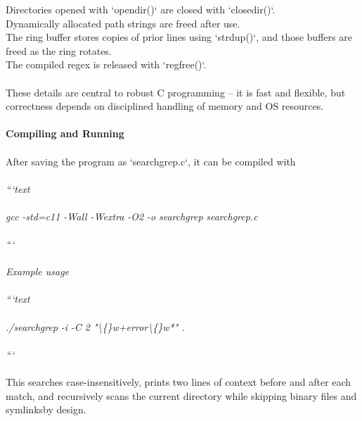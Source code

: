 \documentclass{article}
\begin{document}
{\normalsize Directories opened with }{\normalsize `}{\normalsize opendir}{\normalsize (}{\normalsize )` are closed with `}{\normalsize closedir}{\normalsize ()`.}\\
{\normalsize Dynamically allocated path strings are freed after use.}\\
{\normalsize The ring buffer stores copies of prior lines using `}{\normalsize strdup}{\normalsize (}{\normalsize )`, and those buffers are freed as the ring rotates.}\\
{\normalsize The compiled regex is released with `}{\normalsize regfre}{\normalsize e}{\normalsize (}{\normalsize )`.}\\
\\
{\normalsize These details are central to robust C programming – it is fast and flexible, but correctness depends on disciplined handling of memory and OS resources.}\\
\\
{\large \textbf{Compiling and Running}}\\
\\
{\normalsize After saving the program as `}{\normalsize searchgrep.c}{\normalsize `, it can be compiled with}\\
\\
{\normalsize \textit{```}}{\normalsize \textit{text}}\\
\\
{\normalsize \textit{gcc}}{\normalsize \textit{ -std=c11 -Wall -}}{\normalsize \textit{Wextra}}{\normalsize \textit{ -O2 -o }}{\normalsize \textit{searchgrep}}{\normalsize \textit{ }}{\normalsize \textit{searchgrep.c}}\\
\\
{\normalsize \textit{```}}\\
\\
{\normalsize \textit{Example usage}}\\
\\
{\normalsize \textit{```text}}\\
\\
{\normalsize \textit{./}}{\normalsize \textit{searchgrep}}{\normalsize \textit{ -}}{\normalsize \textit{i}}{\normalsize \textit{ -C 2 "\textbackslash\{\}}}{\normalsize \textit{w+error}}{\normalsize \textit{\textbackslash\{\}w*" .}}\\
\\
{\normalsize \textit{```}}\\
\\
{\normalsize This searches case-insensitively, prints two lines of context before and after each match, and recursively scans the }{\normalsize current directory while skipping binary files and }{\normalsize symlinks}{\normalsize  by design.}\\
\end{document}

